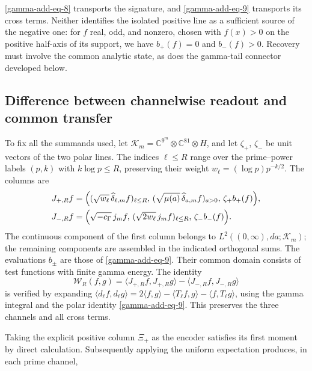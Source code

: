 \eqref{gamma-add-eq-8} transports the signature, and \eqref{gamma-add-eq-9} transports its cross terms. Neither identifies the isolated positive line as a sufficient source of the negative one: for \(f\) real, odd, and nonzero, chosen with \(f(x)>0\) on the positive half-axis of its support, we have \(b_+(f)=0\) and \(b_-(f)>0\). Recovery must involve the common analytic state, as does the gamma-tail connector developed below.

\subsection{Difference between channelwise readout and common transfer}
\label{gamma-add-sub-259}

To fix all the summands used, let
\(\mathcal K_m=\mathbb C^{9^m}\otimes\mathbb C^{81}\otimes H\),
and let \(\zeta_+\), \(\zeta_-\) be unit vectors of the two
polar lines. The indices \(\ell\leq R\) range over the prime--power
labels \((p,k)\) with \(k\log p\leq R\), preserving
their weight \(w_\ell=(\log p)p^{-k/2}\). The columns are
\begin{equation}
\begin{aligned}
J_{+,R}f={}&\Bigl(
 (\sqrt{w_\ell}\,\widehat\delta_{\ell,m}f)_{\ell\leq R},\,
 (\sqrt{\mu(a)}\,\widehat\delta_{a,m}f)_{a>0},\,
 \zeta_+b_+(f)\Bigr),\\
J_{-,R}f={}&\Bigl(
 \sqrt{-c_\Gamma}\,j_mf,\,
 (\sqrt{2w_\ell}\,j_mf)_{\ell\leq R},\,
 \zeta_-b_-(f)\Bigr).
\end{aligned}
\label{gamma-add-columnas-completas}
\end{equation}
The continuous component of the first column belongs to
\(L^2((0,\infty),da;\mathcal K_m)\); the remaining components
are assembled in the indicated orthogonal sums. The evaluations
\(b_\pm\) are those of \eqref{gamma-add-eq-9}. Their common domain
consists of test functions with finite gamma energy. The identity
\begin{equation}
\mathscr W_R(f,g)
=\langle J_{+,R}f,J_{+,R}g\rangle
 -\langle J_{-,R}f,J_{-,R}g\rangle
\label{gamma-add-diferencia-columnas}
\end{equation}
is verified by expanding
\(\langle d_\ell f,d_\ell g\rangle
=2\langle f,g\rangle-\langle T_\ell f,g\rangle
-\langle f,T_\ell g\rangle\), using the gamma integral
and the polar identity \eqref{gamma-add-eq-9}. This preserves
the three channels and all cross terms.

Taking the explicit positive column \(\Xi_+\) as the encoder satisfies its first moment by direct calculation. Subsequently applying the uniform expectation produces, in each prime channel,

